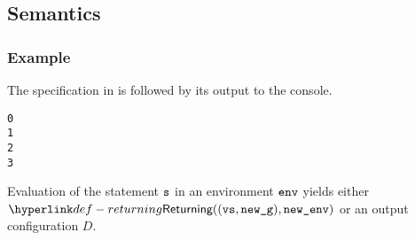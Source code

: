 \subsection{Semantics}
\subsubsection{Example}
The specification in  is followed by its output to the console.
\begin{Verbatim}[fontsize=\footnotesize, frame=single]
0
1
2
3
\end{Verbatim}

\ProseParagraph
Evaluation of the statement $\texttt{s}$ in an environment $\texttt{env}$ yields
either \\ $\Returning((\vvs, \newg), \newenv)$ or an output configuration $D$.

